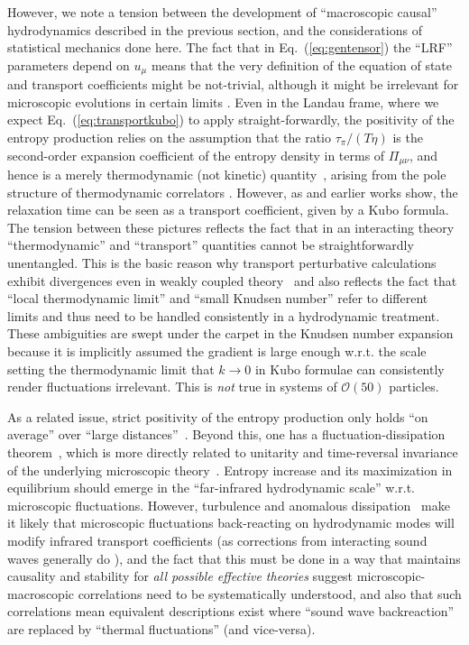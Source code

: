 \documentclass[12pt,onecolumn,showpacs,amssymb,aps,nofootinbib,floatfix]{revtex4-2}
\renewcommand{\eqref}[1]{Eq.~(\ref{#1})}
\newcommand{\order}[1]{ \mathcal{O} \left( #1 \right) }
\newcommand{\travis}{}
\begin{document}
	However, we note a tension between the development of ``macroscopic causal'' hydrodynamics described in the previous section, and the considerations of statistical mechanics done here.
	The fact that in \eqref{eq:gentensor} the ``LRF'' parameters depend on $u_\mu$  means that the very definition of the equation of state and transport coefficients might be not-trivial, although it might be irrelevant for microscopic evolutions in certain limits \cite{hislim,lindblom}. Even in the Landau frame, where we expect \eqref{eq:transportkubo} to apply straight-forwardly, the positivity of the entropy production relies on the assumption that the ratio $\tau_\pi/(T\eta)$ is the second-order expansion coefficient of the entropy density in terms of $\Pi_{\mu \nu}$, and hence is a merely thermodynamic (not kinetic) quantity~\cite{hislim,lindblom}, \color{black} arising from the pole structure of thermodynamic correlators \cite{laurent} \color{black}.
	However, as \cite{jeon,dirkis} and earlier works show, the relaxation time can be seen as a transport coefficient, given by a Kubo formula. 
	The tension between these pictures reflects the fact that in an interacting theory ``thermodynamic'' and ``transport'' quantities cannot be straightforwardly unentangled.  
	This is the basic reason why transport perturbative calculations exhibit divergences even in weakly coupled theory~\cite{arnold} and also reflects the fact that ``local thermodynamic limit'' and ``small Knudsen number'' refer to different limits and thus need to be handled consistently in a hydrodynamic treatment.   \color{black}These ambiguities are swept under the carpet in the Knudsen number expansion because it is implicitly assumed the gradient is large enough w.r.t. the scale setting the thermodynamic limit that $k\to 0$ in Kubo formulae can consistently render fluctuations irrelevant.  This is {\em not} true in systems of $\order{50}$ particles. \color{black}
	
	As a related issue, strict positivity of the entropy production only holds ``on average'' over ``large distances''~\cite{crooks}.  Beyond this, one has a fluctuation-dissipation theorem~\cite{kadanoff,tong}, which is more directly related to unitarity and time-reversal invariance of the underlying microscopic theory~\cite{tong}. Entropy increase and its maximization in equilibrium should emerge in the ``far-infrared hydrodynamic scale'' w.r.t. microscopic fluctuations.
	However, turbulence and anomalous dissipation~\cite{zeroth} make it likely that microscopic fluctuations back-reacting on hydrodynamic modes will modify infrared transport coefficients (as corrections from interacting sound waves generally do \cite{stick,kovfluct,hnatic}), and the fact that this must be done in a way that maintains causality and stability for {\em all possible effective theories} suggest microscopic-macroscopic correlations need to be systematically understood, and also that such correlations mean equivalent descriptions exist where ``sound wave backreaction'' are replaced by ``thermal fluctuations'' (and vice-versa).   
	
\end{document}
